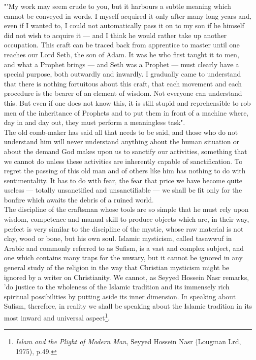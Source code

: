 \documentclass[11pt, b5paper, twoside]{book}
\begin{document}
"'My work may seem crude to you, but it harbours a subtle meaning which cannot be conveyed in words. 
I myself acquired it only after many long years and, even if I wanted to, I could not automatically 
pass it on to my son if he himself did not wish to acquire it --- and I think he would rather take up 
another occupation. This craft can be traced back from apprentice to master until one reaches our 
Lord Seth, the son of Adam. It was he who first taught it to men, and what a Prophet brings --- and 
Seth was a Prophet --- must clearly have a special purpose, both outwardly and inwardly. I gradually 
came to understand that there is nothing fortuitous about this craft, that each movement and each 
procedure is the bearer of an element of wisdom. Not everyone can understand this. But even if one 
does not know this, it is still stupid and reprehensible to rob men of the inheritance of Prophets 
and to put them in front of a machine where, day in and day out, they must perform a meaningless 
task". \\ 


The old comb-maker has said all that needs to be said, and those who do not understand him will never 
understand anything about the human situation or about the demand God makes upon us to sanctify our 
activities, something that we cannot do unless these activities are inherently capable of 
sanctification. To regret the passing of this old man and of others like him has nothing to do with 
sentimentality. It has to do with fear, the fear that price we have become quite useless --- totally 
unsanctified and unsanctifiable --- we shall be fit only for the bonfire which awaits the debris of a 
ruined world. \\

The discipline of the craftsman whose tools are so simple that he must rely upon wisdom, competence 
and manual skill to produce objects which are, in their way, perfect is very similar to the 
discipline of the mystic, whose raw material is not clay, wood or bone, but his own soul. Islamic 
mysticism, called tasawwuf in Arabic and commonly referred to as Sufism, is a vast and complex 
subject, and one which contains many traps for the unwary, but it cannot be ignored in any general 
study of the religion in the way that Christian mysticism might be ignored by a writer on 
Christianity. We cannot, as Seyyed Hossein Nasr remarks, 'do justice to the wholeness of the Islamic 
tradition and its immensely rich spiritual possibilities by putting aside its inner dimension. In 
speaking about Sufism, therefore, in reality we shall be speaking about the Islamic tradition in its 
most inward and universal aspect\footnote{\emph{Islam and the Plight of Modern Man}, Seyyed Hossein Nasr (Lougman Lrd, 1975), p.49.}. \\
\end{document}
